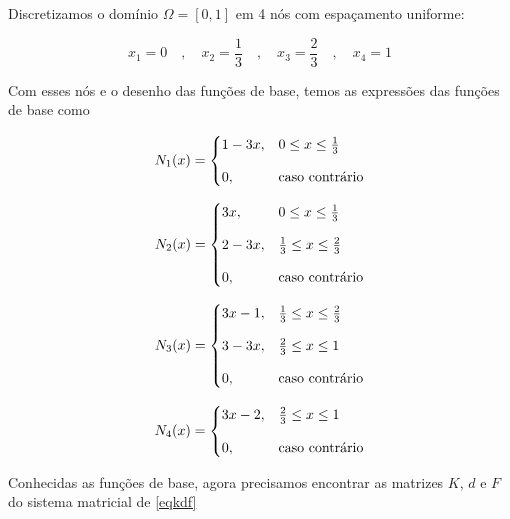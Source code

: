 \documentclass[12pt]{scrartcl}
\begin{document}
Discretizamos o domínio $\Omega = \left[0, 1\right]$ em 4 nós com espaçamento uniforme: 

\[
    x_1 = 0 \quad , \quad x_2 = \frac{1}{3} \quad , \quad x_3 = \frac{2}{3} \quad , \quad x_4 = 1
\] 

Com esses nós e o desenho das funções de base, temos as expressões das funções de base como

\[
    N_1(x) = \begin{cases}
        1 - 3x,   &  0 \leq x \leq \frac{1}{3}           \\
        \noalign{\vskip9pt}
        0,   & \textrm{caso contrário}                     
    \end{cases}
\] 

\[
    N_2(x) = \begin{cases}
        3x,   &  0 \leq x \leq \frac{1}{3}           \\
        \noalign{\vskip9pt}
        2 - 3x,   &  \frac{1}{3} \leq x \leq \frac{2}{3}           \\
        \noalign{\vskip9pt}
        0,   & \textrm{caso contrário}                     
    \end{cases}
\] 

\[
    N_3(x) = \begin{cases}
        3x - 1,   &  \frac{1}{3} \leq x \leq \frac{2}{3}           \\
        \noalign{\vskip9pt}
        3 - 3x,   & \frac{2}{3} \leq x \leq 1            \\
        \noalign{\vskip9pt}
        0,   & \textrm{caso contrário}                     
    \end{cases}
\] 

\[
    N_4(x) = \begin{cases}
        3x - 2,   &  \frac{2}{3} \leq x \leq 1         \\
        \noalign{\vskip9pt}
        0,   & \textrm{caso contrário}                                        
    \end{cases}
\] 

Conhecidas as funções de base, agora precisamos encontrar as matrizes $K$, $d$ e $F$ do sistema matricial de \eqref{eqkdf}
\end{document}
